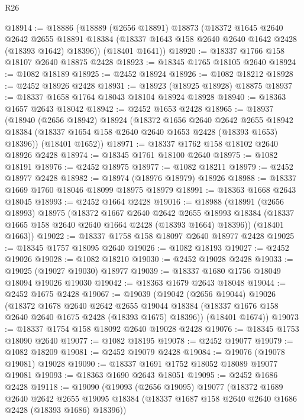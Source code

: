 \begin{lexlean}{R26}
\begin{coremodule}
@18914 := @18886
    (@18889
      (@2656 @18891)
      @18873
      (@18372
        @1645
        @2640
        @2642
        @2655
        @18891
        @18384
        (@18337 @1643 @158 @2640 @2640 @1642 @2428 (@18393 @1642) @18396))
      (@18401 @1641))
@18920 := @18337 @1766 @158 @18107 @2640 @18875 @2428
@18923 := @18345 @1765 @18105 @2640
@18924 := @1082 @18189
@18925 := @2452 @18924
@18926 := @1082 @18212
@18928 := @2452 @18926 @2428
@18931 := @18923 (@18925 @18928) @18875
@18937 := @18337 @1658 @1764 @18043 @18104 @18924 @18928
@18940 := @18363 @1657 @2643 @18042
@18942 := @2452 @1653 @2428
@18965 := @18937
    (@18940
      (@2656 @18942)
      @18924
      (@18372
        @1656
        @2640
        @2642
        @2655
        @18942
        @18384
        (@18337 @1654 @158 @2640 @2640 @1653 @2428 (@18393 @1653) @18396))
      (@18401 @1652))
@18971 := @18337 @1762 @158 @18102 @2640 @18926 @2428
@18974 := @18345 @1761 @18100 @2640
@18975 := @1082 @18191
@18976 := @2452 @18975
@18977 := @1082 @18211
@18979 := @2452 @18977 @2428
@18982 := @18974 (@18976 @18979) @18926
@18988 := @18337 @1669 @1760 @18046 @18099 @18975 @18979
@18991 := @18363 @1668 @2643 @18045
@18993 := @2452 @1664 @2428
@19016 := @18988
    (@18991
      (@2656 @18993)
      @18975
      (@18372
        @1667
        @2640
        @2642
        @2655
        @18993
        @18384
        (@18337 @1665 @158 @2640 @2640 @1664 @2428 (@18393 @1664) @18396))
      (@18401 @1663))
@19022 := @18337 @1758 @158 @18097 @2640 @18977 @2428
@19025 := @18345 @1757 @18095 @2640
@19026 := @1082 @18193
@19027 := @2452 @19026
@19028 := @1082 @18210
@19030 := @2452 @19028 @2428
@19033 := @19025 (@19027 @19030) @18977
@19039 := @18337 @1680 @1756 @18049 @18094 @19026 @19030
@19042 := @18363 @1679 @2643 @18048
@19044 := @2452 @1675 @2428
@19067 := @19039
    (@19042
      (@2656 @19044)
      @19026
      (@18372
        @1678
        @2640
        @2642
        @2655
        @19044
        @18384
        (@18337 @1676 @158 @2640 @2640 @1675 @2428 (@18393 @1675) @18396))
      (@18401 @1674))
@19073 := @18337 @1754 @158 @18092 @2640 @19028 @2428
@19076 := @18345 @1753 @18090 @2640
@19077 := @1082 @18195
@19078 := @2452 @19077
@19079 := @1082 @18209
@19081 := @2452 @19079 @2428
@19084 := @19076 (@19078 @19081) @19028
@19090 := @18337 @1691 @1752 @18052 @18089 @19077 @19081
@19093 := @18363 @1690 @2643 @18051
@19095 := @2452 @1686 @2428
@19118 := @19090
    (@19093
      (@2656 @19095)
      @19077
      (@18372
        @1689
        @2640
        @2642
        @2655
        @19095
        @18384
        (@18337 @1687 @158 @2640 @2640 @1686 @2428 (@18393 @1686) @18396))

\end{coremodule}
\end{lexlean}
